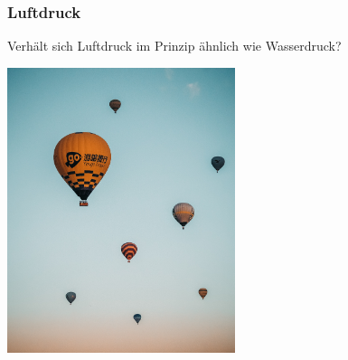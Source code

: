 \documentclass{beamer}
\begin{document}
\begin{frame}
\frametitle{Luftdruck}

Verhält sich Luftdruck im Prinzip ähnlich wie Wasserdruck? 

\begin{center}
\includegraphics[width=0.5\textwidth]{hot_air_balloons.jpg}
\end{center}


\end{frame}
\end{document}
